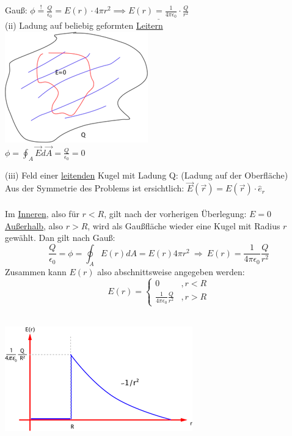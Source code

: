 \documentclass[11pt]{article}
\begin{document}
Gauß: $\phi\overset{!}{=} \frac{Q}{\epsilon_0}=E(r)\cdot4\pi r^2 \implies \underline{E(r)=\frac{1}{4\pi\epsilon_0}\cdot\frac{Q}{r^2}}$\\

(ii) Ladung auf beliebig geformten \underline{Leitern}\\

\includegraphics{skizzen/14/14_6B3}\\

$\phi=\oint_{A}\vec{E}d\vec{A}=\frac{Q}{\epsilon_0}=0$\\
\newpage

(iii) Feld einer \underline{leitenden} Kugel mit Ladung Q: (Ladung auf der Oberfläche)\\

Aus der Symmetrie des Problems ist ersichtlich:
$ \vec{E}(\vec{r})= E(\vec{r})\cdot\hat{e}_r $\\
\\
Im \underline{Inneren}, also für $r<R$, gilt nach der vorherigen Überlegung: $E=0$\\
\underline{Außerhalb}, also $r>R$, wird als Gaußfläche wieder eine Kugel mit Radius $r$ gewählt. Dan  gilt nach Gauß:
$$\frac{Q}{\epsilon_0}=\phi=\oint_AE(r)dA=E(r)4\pi r^2\ \Rightarrow\ E(r)=\frac{1}{4\pi\epsilon_0}\frac{Q}{r^2}$$
Zusammen kann $E(r)$ also abschnittsweise angegeben werden:
\[
     E(r)=\left\{\begin{array}{ll} 0 & ,r<R \\
         \frac{1}{4\pi\epsilon_0}\frac{Q}{r^2} & ,r>R\end{array}\right.
  \]

\hfill\\

\includegraphics{skizzen/14/14_6B5}\\
\end{document}
